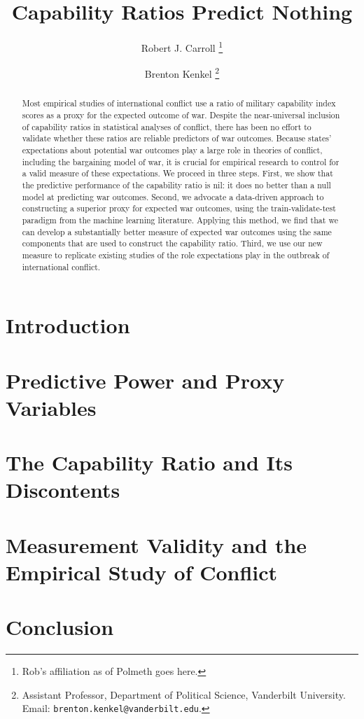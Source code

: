 \documentclass[11pt,oneside]{article}
\title{
  Capability Ratios Predict Nothing%
}
\author{%
  Robert J. Carroll%
  \thanks{%
    Rob's affiliation as of Polmeth goes here.
  }%
  \and%
  Brenton Kenkel%
  \thanks{
    Assistant Professor, Department of Political Science, Vanderbilt University.
    Email: \nolinkurl{brenton.kenkel@vanderbilt.edu}.
  }%
}
\begin{document}
\maketitle

\begin{abstract}
  Most empirical studies of international conflict use a ratio of military capability index scores as a proxy for the expected outcome of war.
  Despite the near-universal inclusion of capability ratios in statistical analyses of conflict, there has been no effort to validate whether these ratios are reliable predictors of war outcomes.
  Because states' expectations about potential war outcomes play a large role in theories of conflict, including the bargaining model of war, it is crucial for empirical research to control for a valid measure of these expectations.
  We proceed in three steps.
  First, we show that the predictive performance of the capability ratio is nil: it does no better than a null model at predicting war outcomes.
  Second, we advocate a data-driven approach to constructing a superior proxy for expected war outcomes, using the train-validate-test paradigm from the machine learning literature.
  Applying this method, we find that we can develop a substantially better measure of expected war outcomes using the same components that are used to construct the capability ratio.
  Third, we use our new measure to replicate existing studies of the role expectations play in the outbreak of international conflict.
\end{abstract}

\clearpage


\section{Introduction}


\section{Predictive Power and Proxy Variables}


\section{The Capability Ratio and Its Discontents}





\section{Measurement Validity and the Empirical Study of Conflict}


\section{Conclusion}
\end{document}
